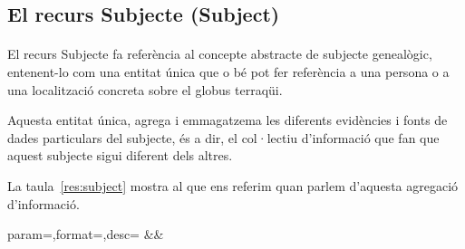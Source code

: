 \subsection{El recurs Subjecte (Subject)}

    \paragraph{}
    El recurs Subjecte fa referència al concepte abstracte de subjecte genealògic, entenent-lo com una entitat única que o bé pot fer referència a una persona o a una localització concreta sobre el globus terraqüi.

    Aquesta entitat única, agrega i emmagatzema les diferents evidències i fonts de dades particulars del subjecte, és a dir, el col·lectiu d'informació que fan que aquest subjecte sigui diferent dels altres.

    La taula~\ref{res:subject} mostra al que ens referim quan parlem d'aquesta agregació d'informació.

    \begin{center}
             {param=\param,format=\format,desc=\desc}
             {\param&\format&\desc}
     \end{center}

